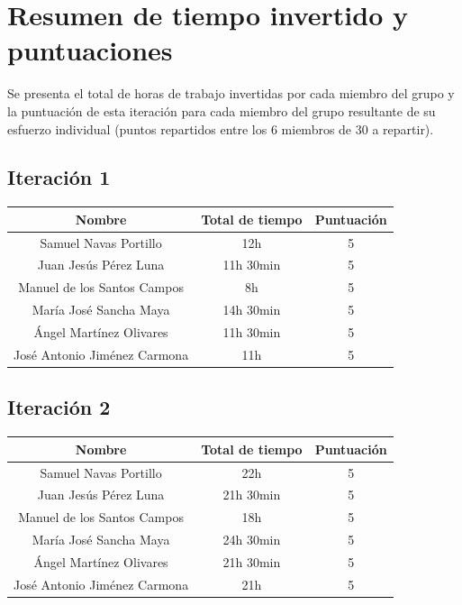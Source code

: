 \documentclass[11 pt]{book}
\begin{document}
	\section{Resumen de tiempo invertido y puntuaciones}
		Se presenta el total de horas de trabajo invertidas por cada miembro del grupo y la puntuación de esta iteración para cada miembro del grupo resultante de su esfuerzo individual (puntos repartidos entre los 6 miembros de 30 a repartir).\\
			
		\subsection*{Iteración 1}
			\begin{tabular}{|c|c|c|}
				\hline
				Nombre & Total de tiempo & Puntuación\\
				\hline
				Samuel Navas Portillo & 12h & 5\\
				Juan Jesús Pérez Luna & 11h 30min & 5\\
				Manuel de los Santos Campos & 8h & 5\\
				María José Sancha Maya & 14h 30min & 5\\
				Ángel Martínez Olivares & 11h 30min & 5\\
				José Antonio Jiménez Carmona & 11h & 5\\
				\hline
			\end{tabular}
		
		\subsection*{Iteración 2}
			\begin{tabular}{|c|c|c|}
				\hline
				Nombre & Total de tiempo & Puntuación\\
				\hline
				Samuel Navas Portillo & 22h & 5\\
				Juan Jesús Pérez Luna & 21h 30min & 5\\
				Manuel de los Santos Campos & 18h & 5\\
				María José Sancha Maya & 24h 30min & 5\\
				Ángel Martínez Olivares & 21h 30min & 5\\
				José Antonio Jiménez Carmona & 21h & 5\\
				\hline
			\end{tabular}
			
\end{document}
